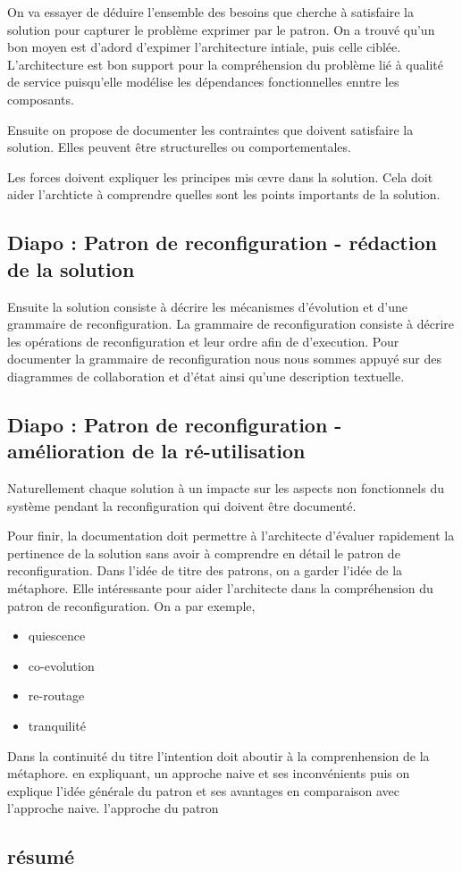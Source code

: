 On va essayer de déduire l'ensemble des besoins que cherche à
satisfaire la solution pour capturer le problème exprimer par le
patron. 
On a trouvé qu'un bon moyen est d'adord d'expimer l'architecture
intiale, puis celle ciblée. 
L'architecture est bon support pour la compréhension du problème lié à
qualité de service puisqu'elle modélise les dépendances fonctionnelles
enntre les composants. 

Ensuite on propose de documenter les contraintes que doivent satisfaire
la solution. Elles peuvent être structurelles ou comportementales.

Les forces doivent expliquer les principes mis \oe{}vre dans la
solution. Cela doit aider l'archticte à comprendre quelles sont les
points importants de la solution.  

\subsection{Diapo : Patron de reconfiguration - rédaction de la solution}

Ensuite la solution consiste à décrire les mécanismes d'évolution
et d'une grammaire de reconfiguration. La grammaire de reconfiguration
consiste à  décrire les opérations de reconfiguration et leur ordre
afin de d'execution. Pour documenter la grammaire de reconfiguration
nous nous sommes appuyé sur des diagrammes de collaboration et d'état
ainsi qu'une description textuelle. 


\subsection{Diapo : Patron de reconfiguration - amélioration de la
ré-utilisation}

Naturellement chaque solution à un impacte sur les aspects non
fonctionnels du système pendant la reconfiguration qui doivent être
documenté. 

Pour finir, la documentation doit permettre à l'architecte d'évaluer
rapidement la pertinence de la solution sans avoir à comprendre en
détail le patron de reconfiguration. Dans l'idée de titre des patrons, on a garder l'idée de la métaphore.
Elle intéressante pour aider l'architecte dans la compréhension du
patron de reconfiguration. On a par exemple,
\begin{itemize}
\item quiescence 
\item co-evolution
\item re-routage
\item tranquilité
\end{itemize}

Dans la continuité du titre l'intention doit aboutir à la
comprenhension de la métaphore. en expliquant, un approche naive et
ses inconvénients puis on explique l'idée générale du patron et ses
avantages en comparaison avec l'approche naive. 
l'approche du patron  

\subsection{résumé } 
